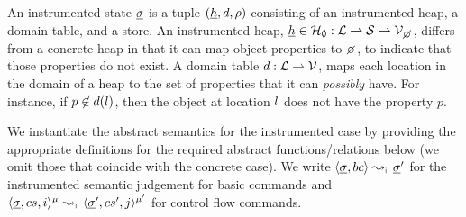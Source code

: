 An instrumented state $\underline{\sigma}$ is a tuple $(\underline{h}, d, \rho)$ consisting of an instrumented heap, 
a domain table, and a store. 
%
An instrumented heap, $\iheap \in \iheaps : \locs \partialmap \strings \partialmap \setext{\vals}{\none}$, 
differs from a concrete heap in that it can map object properties to $\none$, to indicate that those properties 
do not exist. 
%
A domain table $d : {\mathcal L} \rightharpoonup \mathcal{V}$, maps each location in the domain of a heap to the set 
of properties that it can \emph{possibly} have. For instance, if $p \not\in d(l)$, then the object 
at location $l$ does not have the property $p$. 
%

We instantiate the abstract semantics for the instrumented case by providing the appropriate definitions 
for the required abstract functions/relations below (we omit those that coincide with the concrete case). 
We write $\absbsemrule{\istate, \bcmd}{\istate'}{\instrumented}$ for the instrumented semantic 
judgement for basic commands and $\abssemrule{\istate, \cs, i}{\istate', \cs', j}{\mode}{\mode'}{\instrumented}$ 
for control flow commands. 

